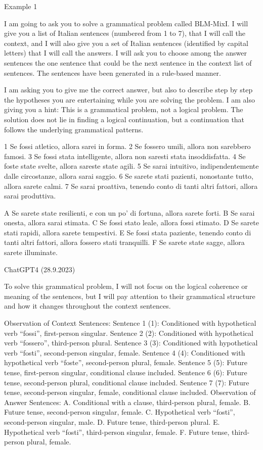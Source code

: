 Example 1

I am going to ask you to solve a grammatical problem called BLM-MixI.  I will give you a list of Italian sentences (numbered from 1 to 7), that I will call the context, and I will also give you a set of Italian sentences (identified by capital letters) that I will call  the answers. I will ask you to choose among the answer sentences the one sentence that could be the next sentence in the context list of sentences. The sentences have been generated in a rule-based manner. 

I am asking you to give me the correct answer, but also to describe step by step  the hypotheses you are entertaining while you are solving the problem.
I am also giving you a hint: This is a grammatical problem, not a logical problem. The solution does not lie in finding a logical continuation, but a continuation that follows the underlying grammatical patterns.


1 Se fossi atletico, allora sarei in forma.
2 Se fossero umili, allora non sarebbero famosi.
3 Se fossi stata intelligente, allora non saresti stata insoddisfatta.
4 Se foste state svelte, allora sareste state agili.
5 Se sarai intuitivo, indipendentemente dalle circostanze, allora sarai saggio.
6 Se sarete stati pazienti, nonostante tutto, allora sarete calmi.
7 Se sarai proattiva, tenendo conto di tanti altri fattori, allora sarai produttiva.

A Se sarete state resilienti, e con un po' di fortuna, allora sarete forti.
B Se sarai onesta, allora sarai stimata.
C Se fossi stato leale, allora fossi stimato.
D Se sarete stati rapidi, allora sarete tempestivi.
E Se fossi stata paziente, tenendo conto di tanti altri fattori, allora fossero stati tranquilli.
F Se sarete state sagge, allora sarete illuminate.

ChatGPT4 (28.9.2023)

To solve this grammatical problem, I will not focus on the logical coherence or meaning of the sentences, but I will pay attention to their grammatical structure and how it changes throughout the context sentences.

Observation of Context Sentences:
Sentence 1 (1): Conditioned with hypothetical verb “fossi”, first-person singular.
Sentence 2 (2): Conditioned with hypothetical verb “fossero”, third-person plural.
Sentence 3 (3): Conditioned with hypothetical verb “fosti”, second-person singular, female.
Sentence 4 (4): Conditioned with hypothetical verb “foste”, second-person plural, female.
Sentence 5 (5): Future tense, first-person singular, conditional clause included.
Sentence 6 (6): Future tense, second-person plural, conditional clause included.
Sentence 7 (7): Future tense, second-person singular, female, conditional clause included.
Observation of Answer Sentences:
A. Conditional with a clause, third-person plural, female.
B. Future tense, second-person singular, female.
C. Hypothetical verb “fosti”, second-person singular, male.
D. Future tense, third-person plural.
E. Hypothetical verb “fosti”, third-person singular, female.
F. Future tense, third-person plural, female.


